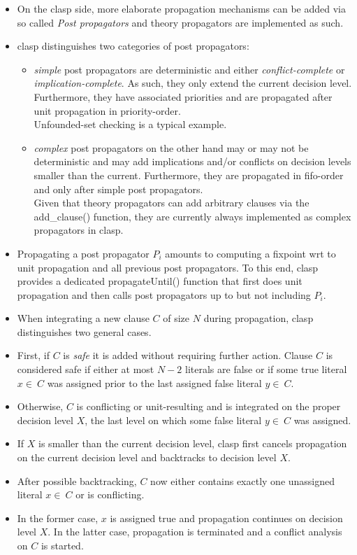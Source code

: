 \begin{itemize}
  \item On the clasp side, more elaborate propagation mechanisms can be added via so called \emph{Post propagators}
        and theory propagators are implemented as such.
  \item clasp distinguishes two categories of post propagators:
  \begin{itemize}
    \item \textit{simple} post propagators are deterministic and either \textit{conflict-complete} or \textit{implication-complete}.
    As such, they only extend the current decision level. Furthermore, they have associated priorities and
    are propagated after unit propagation in priority-order. \\
    Unfounded-set checking is a typical example.
    \item \textit{complex} post propagators on the other hand may or may not be deterministic and may
    add implications and/or conflicts on decision levels smaller than the current.
    Furthermore, they are propagated in fifo-order and only after simple post propagators.\\
    Given that theory propagators can add arbitrary clauses via the add\_clause() function,
    they are currently always implemented as complex propagators in clasp.
  \end{itemize}
  \item Propagating a post propagator $P_i$ amounts to computing a fixpoint wrt to unit propagation and all previous
        post propagators. To this end, clasp provides a dedicated propagateUntil() function that
        first does unit propagation and then calls post propagators up to but not including $P_i$.

  \item When integrating a new clause $C$ of size $N$ during propagation, clasp distinguishes two general cases.
  \item First, if $C$ is \emph{safe} it is added without requiring further action. Clause $C$ is considered safe
        if either at most $N-2$ literals are false or if some true literal $x\in~C$
        was assigned prior to the last assigned false literal $y\in~C$.
  \item Otherwise, $C$ is conflicting or unit-resulting and is integrated on the proper decision level $X$,
        the last level on which some false literal $y\in~C$ was assigned.
  \item If $X$ is smaller than the current decision level, clasp first cancels propagation on the current decision level and backtracks to decision level $X$.
  \item After possible backtracking, $C$ now either contains exactly one unassigned literal $x\in~C$ or is conflicting.
  \item In the former case, $x$ is assigned true and propagation continues on decision level $X$.
        In the latter case, propagation is terminated and a conflict analysis on $C$ is started.


\end{itemize}
